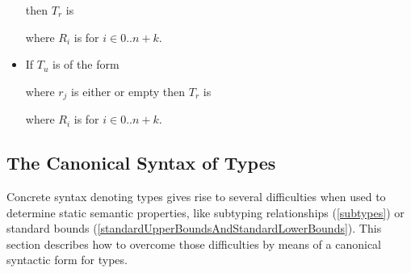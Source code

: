 \documentclass[makeidx]{article}
\begin{document}
\begin{itemize}
  \noindent
  then $T_r$ is

  \noindent
  where $R_i$ is  for $i \in 0 .. n+k$.
\item If $T_u$ is of the form

  \noindent
  where $r_j$ is either \REQUIRED{} or empty
  then $T_r$ is
  \noindent

  \noindent
  where $R_i$ is  for $i \in 0 .. n+k$.
\end{itemize}



\subsection{The Canonical Syntax of Types}

\LMHash{}%
Concrete syntax denoting types gives rise to several difficulties
when used to determine static semantic properties,
like subtyping relationships
(\ref{subtypes})
or standard bounds
(\ref{standardUpperBoundsAndStandardLowerBounds}).
This section describes how to overcome those difficulties
by means of a canonical syntactic form for types.
\end{document}
